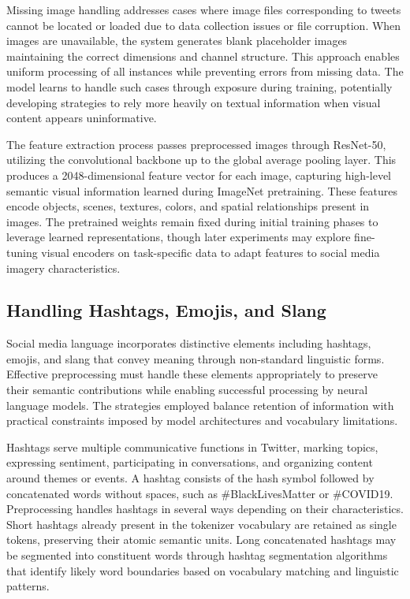 \documentclass[12pt,a4paper]{report}
\begin{document}
Missing image handling addresses cases where image files corresponding to tweets cannot be located or loaded due to data collection issues or file corruption. When images are unavailable, the system generates blank placeholder images maintaining the correct dimensions and channel structure. This approach enables uniform processing of all instances while preventing errors from missing data. The model learns to handle such cases through exposure during training, potentially developing strategies to rely more heavily on textual information when visual content appears uninformative.

The feature extraction process passes preprocessed images through ResNet-50, utilizing the convolutional backbone up to the global average pooling layer. This produces a 2048-dimensional feature vector for each image, capturing high-level semantic visual information learned during ImageNet pretraining. These features encode objects, scenes, textures, colors, and spatial relationships present in images. The pretrained weights remain fixed during initial training phases to leverage learned representations, though later experiments may explore fine-tuning visual encoders on task-specific data to adapt features to social media imagery characteristics.

\subsection{Handling Hashtags, Emojis, and Slang}

Social media language incorporates distinctive elements including hashtags, emojis, and slang that convey meaning through non-standard linguistic forms. Effective preprocessing must handle these elements appropriately to preserve their semantic contributions while enabling successful processing by neural language models. The strategies employed balance retention of information with practical constraints imposed by model architectures and vocabulary limitations.

Hashtags serve multiple communicative functions in Twitter, marking topics, expressing sentiment, participating in conversations, and organizing content around themes or events. A hashtag consists of the hash symbol followed by concatenated words without spaces, such as #BlackLivesMatter or #COVID19. Preprocessing handles hashtags in several ways depending on their characteristics. Short hashtags already present in the tokenizer vocabulary are retained as single tokens, preserving their atomic semantic units. Long concatenated hashtags may be segmented into constituent words through hashtag segmentation algorithms that identify likely word boundaries based on vocabulary matching and linguistic patterns.
\end{document}
